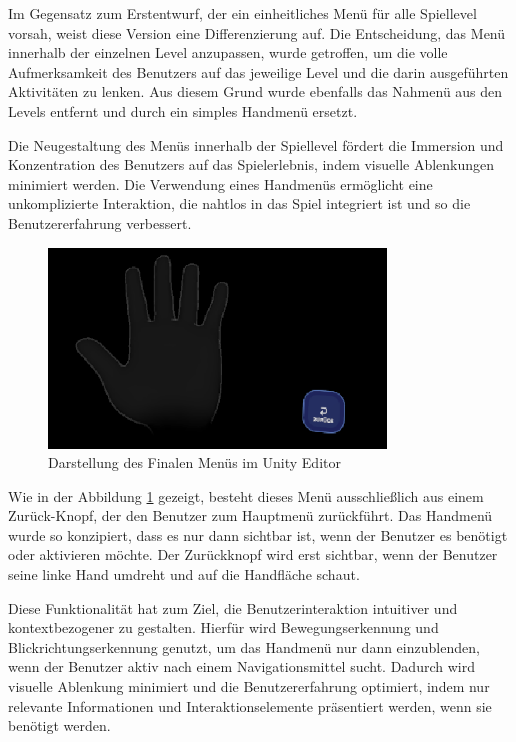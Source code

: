 Im Gegensatz zum Erstentwurf, der ein einheitliches Menü für alle Spiellevel vorsah, weist diese Version eine
Differenzierung auf. Die Entscheidung, das Menü innerhalb der einzelnen Level anzupassen, wurde getroffen, um die volle
Aufmerksamkeit des Benutzers auf das jeweilige Level und die darin ausgeführten Aktivitäten zu lenken. Aus diesem Grund
wurde ebenfalls das Nahmenü aus den Levels entfernt und durch ein simples Handmenü ersetzt.

Die Neugestaltung des Menüs innerhalb der Spiellevel fördert die Immersion und Konzentration des Benutzers auf das
Spielerlebnis, indem visuelle Ablenkungen minimiert werden. Die Verwendung eines Handmenüs ermöglicht eine unkomplizierte
Interaktion, die nahtlos in das Spiel integriert ist und so die Benutzererfahrung verbessert.

\begin{figure}[H]
    \centering
    \includegraphics[width=0.8\textwidth]{images/backbutton.png}
    \caption{Darstellung des Finalen Menüs im Unity Editor}
    \label{fig:backbutton}
\end{figure}

Wie in der Abbildung \ref{fig:backbutton} gezeigt, besteht dieses Menü ausschließlich aus einem Zurück-Knopf, der den
Benutzer zum Hauptmenü zurückführt. Das Handmenü wurde so konzipiert, dass es nur dann sichtbar ist, wenn der Benutzer
es benötigt oder aktivieren möchte.  Der Zurückknopf wird erst sichtbar, wenn der Benutzer seine linke Hand umdreht und
auf die Handfläche schaut.

Diese Funktionalität hat zum Ziel, die Benutzerinteraktion intuitiver und kontextbezogener zu gestalten. Hierfür wird
Bewegungserkennung und Blickrichtungserkennung genutzt, um das Handmenü nur dann einzublenden, wenn der Benutzer aktiv
nach einem Navigationsmittel sucht. Dadurch wird visuelle Ablenkung minimiert und die Benutzererfahrung optimiert, indem
nur relevante Informationen und Interaktionselemente präsentiert werden, wenn sie benötigt werden.

